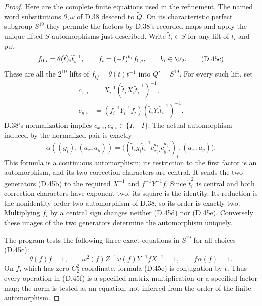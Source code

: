 \begin{proof}
Here are the complete finite equations used in the
refinement.  The named word substitutions $\theta,
\omega$ of D.38 descend to $\widetilde Q$.
On its characteristic perfect subgroup $S^{19}$ they
permute the factors by D.38's recorded maps and apply
the unique lifted $S$ automorphisms just described.
Write $\widetilde t_i\in S$ for any lift of $t_i$ and
put
\[
 f_{0,i}=\theta(\widetilde t)_i\widetilde t_i^{-1},
 \qquad
 f_i=(-I)^{b_i}f_{0,i},\qquad b_i\in\F_2.
                                                        \tag{D.45c}
\]
These are all the $2^{19}$ lifts of
$f_Q=\theta(t)t^{-1}$ into
$\widetilde Q'=S^{19}$.
For every such lift, set
\[
 \begin{split}
 c_{x,i}&=X_i^{-1}
       (\widetilde t_i X_i\widetilde t_i^{-1})^{-1},\\
 c_{y,i}&=(f_i^{-1}Y_i^{-1}f_i)
       (\widetilde t_i Y_i\widetilde t_i^{-1})^{-1}.
 \end{split}                                             \tag{D.45d}
\]
D.38's normalization implies $c_{x,i},c_{y,i}\in
\{I,-I\}$.  The actual automorphism induced by the
normalized pair is exactly
\[
 \alpha((g_i),(a_x,a_y))=
 \bigl((\widetilde t_i g_i\widetilde t_i^{-1}
           c_{x,i}^{a_x}c_{y,i}^{a_y})_i,
                      (a_x,a_y)\bigr).
                                                        \tag{D.45e}
\]
This formula is a continuous automorphism; its
restriction to the first factor is an automorphism,
and its two correction characters are central.
It sends the two generators (D.45b) to the required
$X^{-1}$ and $f^{-1}Y^{-1}f$.
Since $\widetilde t_i^2$ is central and both correction
characters have exponent two, its square is the
identity.  Its reduction is the nonidentity order-two
automorphism of D.38, so its order is exactly two.
Multiplying $f_i$ by a central sign changes neither
(D.45d) nor (D.45e).  Conversely these images of the
two generators determine the automorphism uniquely.

The program tests the following three exact equations
in $S^{19}$ for all choices (D.45c):
\[
 \theta(f)f=1,\qquad
 \omega^2(f)Z^{-1}\omega(f)Y^{-1}fX^{-1}=1,
 \qquad f\alpha(f)=1.
                                                        \tag{D.45f}
\]
On $f$, which has zero $C_2^2$ coordinate, formula
(D.45e) is conjugation by $\widetilde t$.
Thus every operation in (D.45f) is a specified
matrix multiplication or a specified factor map;
the norm is tested as an equation, not inferred
from the order of the finite automorphism.


\end{proof}
